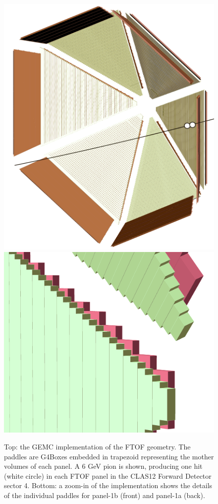 \begin{figure}
	\centering
	\includegraphics[width=0.99\columnwidth,keepaspectratio]{img/ftofGeometry.png}
	\includegraphics[width=0.99\columnwidth,keepaspectratio]{img/ftofDetail.png}
	\caption{Top: the GEMC implementation of the FTOF geometry. The paddles are G4Boxes embedded in trapezoid
             representing the mother volumes of each panel. A 6 GeV pion is shown, producing one hit (white circle) in each FTOF panel
             in the CLAS12 Forward Detector sector 4.
             Bottom: a zoom-in of the implementation shows the details of the individual paddles for panel-1b (front)
             and panel-1a (back). }
	\label{fig:ftofGeometry}
\end{figure}

